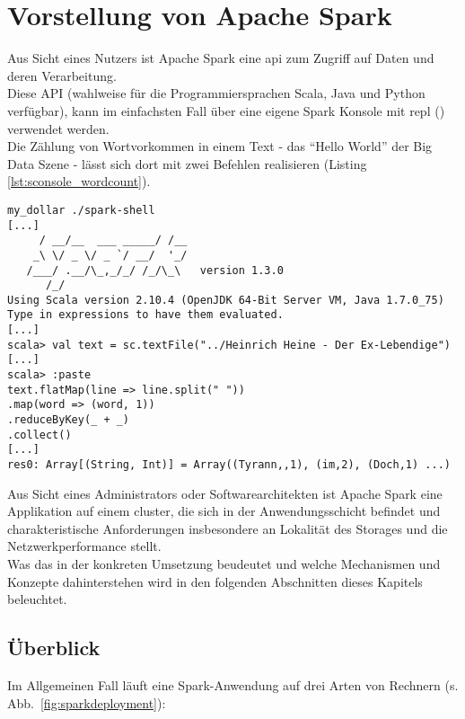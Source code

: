 \chapter{Vorstellung von Apache Spark}
Aus Sicht eines Nutzers ist Apache Spark eine \gls{api} zum Zugriff auf Daten und deren Verarbeitung.\\

Diese API (wahlweise für die Programmiersprachen Scala, Java und Python verfügbar), kann im einfachsten Fall über eine eigene Spark Konsole mit \gls{repl} (\cite{Hail}) verwendet werden.\\
Die Zählung von Wortvorkommen in einem Text - das "`Hello World"' der Big Data Szene - lässt sich dort mit zwei Befehlen realisieren (Listing \ref{lst:sconsole_wordcount}).\\

\begin{lstlisting}[caption={Word Count in der Spark Konsole},label={lst:sconsole_wordcount}]
my_dollar ./spark-shell
[...]
     / __/__  ___ _____/ /__
    _\ \/ _ \/ _ `/ __/  '_/
   /___/ .__/\_,_/_/ /_/\_\   version 1.3.0
      /_/
Using Scala version 2.10.4 (OpenJDK 64-Bit Server VM, Java 1.7.0_75)
Type in expressions to have them evaluated.
[...]
scala> val text = sc.textFile("../Heinrich Heine - Der Ex-Lebendige")
[...]
scala> :paste
text.flatMap(line => line.split(" "))
.map(word => (word, 1))
.reduceByKey(_ + _)
.collect()
[...]
res0: Array[(String, Int)] = Array((Tyrann,,1), (im,2), (Doch,1) ...)
\end{lstlisting}


Aus Sicht eines Administrators oder Softwarearchitekten ist Apache Spark eine Applikation auf einem \gls{cluster}, die sich in der Anwendungsschicht befindet und charakteristische Anforderungen insbesondere an Lokalität des Storages und die Netzwerkperformance stellt.\\

Was das in der konkreten Umsetzung beudeutet und welche Mechanismen und Konzepte dahinterstehen wird in den folgenden Abschnitten dieses Kapitels beleuchtet.

\section{Überblick}
Im Allgemeinen Fall läuft eine Spark-Anwendung auf drei Arten von Rechnern (s. Abb.~\ref{fig:sparkdeployment}):

